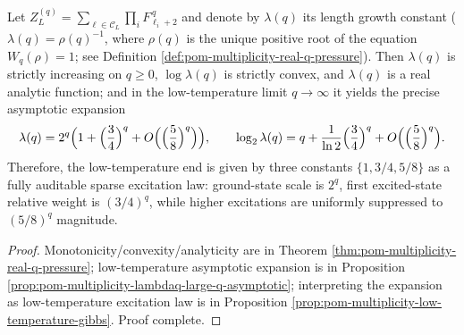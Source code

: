 \begin{conclusion}[Strict sparse excitation law at low temperature: \texorpdfstring{$\lambda(q)=2^q\bigl(1+(3/4)^q+O((5/8)^q)\bigr)$}{lambda(q)=2^q(1+(3/4)^q+O((5/8)^q))}]\label{con:xi-terminal-low-temperature-sparse-excitation-law}
Let
\(
Z_L^{(q)}=\sum_{\boldsymbol{\ell}\in \mathcal C_L}\prod_i F_{\ell_i+2}^{\,q}
\)
and denote by \(\lambda(q)\) its length growth constant (\(\lambda(q)=\rho(q)^{-1}\), where \(\rho(q)\) is the unique positive root of the equation \(W_q(\rho)=1\); see Definition \ref{def:pom-multiplicity-real-q-pressure}).
Then \(\lambda(q)\) is strictly increasing on \(q\ge 0\), \(\log\lambda(q)\) is strictly convex, and \(\lambda(q)\) is a real analytic function;
and in the low-temperature limit \(q\to\infty\) it yields the precise asymptotic expansion
\[
\lambda(q)=2^q\Bigl(1+\Bigl(\frac34\Bigr)^q+O\Bigl(\Bigl(\frac58\Bigr)^q\Bigr)\Bigr),
\qquad
\log_2\lambda(q)=q+\frac{1}{\ln 2}\Bigl(\frac34\Bigr)^q+O\Bigl(\Bigl(\frac58\Bigr)^q\Bigr).
\]
Therefore, the low-temperature end is given by three constants \(\{1,3/4,5/8\}\) as a fully auditable sparse excitation law: ground-state scale is \(2^q\), first excited-state relative weight is \((3/4)^q\), while higher excitations are uniformly suppressed to \((5/8)^q\) magnitude.
\end{conclusion}
\begin{proof}[Proof]
Monotonicity/convexity/analyticity are in Theorem \ref{thm:pom-multiplicity-real-q-pressure};
low-temperature asymptotic expansion is in Proposition \ref{prop:pom-multiplicity-lambdaq-large-q-asymptotic};
interpreting the expansion as low-temperature excitation law is in Proposition \ref{prop:pom-multiplicity-low-temperature-gibbs}. Proof complete.
\end{proof}

